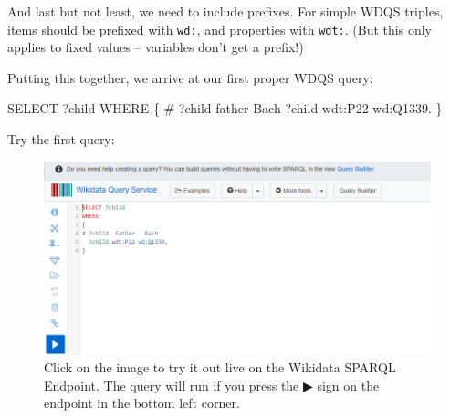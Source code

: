 \documentclass[
  letterpaper,
  DIV=11,
  numbers=noendperiod]{scrreprt}
\newenvironment{Shaded}{\begin{snugshade}}{\end{snugshade}}
\newcommand{\CommentTok}[1]{\textcolor[rgb]{0.37,0.37,0.37}{#1}}
\newcommand{\NormalTok}[1]{\textcolor[rgb]{0.00,0.23,0.31}{#1}}
\newcommand{\SpecialCharTok}[1]{\textcolor[rgb]{0.37,0.37,0.37}{#1}}
\begin{document}
And last but not least, we need to include prefixes. For simple WDQS
triples, items should be prefixed with \texttt{wd:}, and properties with
\texttt{wdt:}. (But this only applies to fixed values -- variables don't
get a prefix!)

Putting this together, we arrive at our first proper WDQS query:

\begin{Shaded}
\begin{Highlighting}[]
\NormalTok{SELECT ?child}
\NormalTok{WHERE}
\NormalTok{\{}
\CommentTok{\# ?child  father   Bach}
\NormalTok{  ?child wdt}\SpecialCharTok{:}\NormalTok{P22 wd}\SpecialCharTok{:}\NormalTok{Q1339.}
\NormalTok{\}}
\end{Highlighting}
\end{Shaded}

Try the first query:

\begin{figure}[H]

{\centering \includegraphics{png/wikidata-tutorial/sparql-example-bach-children-without-labels.png}

}

\caption{Click on the image to try it out live on the Wikidata SPARQL
Endpoint. The query will run if you press the ▶ sign on the endpoint in
the bottom left corner.}

\end{figure}%
\end{document}
